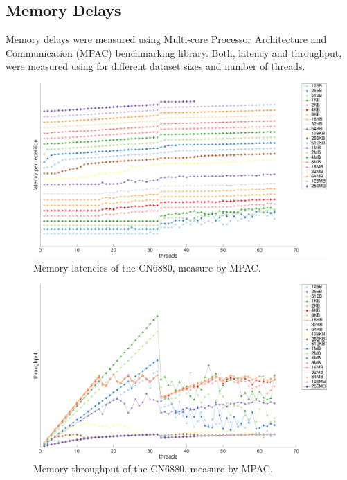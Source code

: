 \subsection{Memory Delays}
\label{sec:memory-delays}

Memory delays were measured using Multi-core Processor Architecture and Communication (MPAC) benchmarking library. \cite{cite} Both, latency and throughput, were measured using for different dataset sizes and number of threads.

\begin{figure}[]
  \begin{center}
    \includegraphics[width=\textwidth]{images/mem-latency.pdf}
    \caption{Memory latencies of the CN6880, measure by MPAC.}
    \label{fig:mem-latency}
  \end{center}
\end{figure}


\begin{figure}[]
  \begin{center}
    \includegraphics[width=\textwidth]{images/mem-throughput.pdf}
    \caption{Memory throughput of the CN6880, measure by MPAC.}
    \label{fig:mem-throughput}
  \end{center}
\end{figure}

